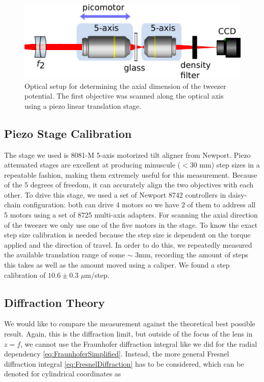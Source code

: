 \begin{figure}
    \centering
    \includegraphics[width=0.6\linewidth]{figures/ZScanSetup.pdf}
    \caption{Optical setup for determining the axial dimension of the tweezer potential. The first objective was scanned along the optical axis using a piezo linear translation stage.}
    \label{fig:ZScanSetup}
\end{figure}


\subsection{Piezo Stage Calibration}

The stage we used is 8081-M 5-axis motorized tilt aligner from Newport. 
Piezo attenuated stages are excellent at producing minuscule ($<30$ mm) step sizes in a repeatable fashion, making them extremely useful for this measurement.
Because of the 5 degrees of freedom, it can accurately align the two objectives with each other. 
To drive this stage, we used a set of Newport 8742 controllers in daisy-chain configuration: both can drive 4 motors so we have 2 of them to address all 5 motors using a set of 8725 multi-axis adapters.
For scanning the axial direction of the tweezer we only use one of the five motors in the stage. 
To know the exact step size calibration is needed because the step size is dependent on the torque applied and the direction of travel.
In order to do this, we repeatedly measured the available translation range of some $\sim$ 3mm, recording the amount of steps this takes as well as the amount moved using a caliper. 
We found a step calibration of $10.6 \pm 0.3$ $\mu$m/step.

\subsection{Diffraction Theory}

We would like to compare the measurement against the theoretical best possible result.
Again, this is the diffraction limit, but outside of the focus of the lens in $z=f$, we cannot use the Fraunhofer diffraction integral like we did for the radial dependency \cref{eq:FraunhoferSimplified}. 
Instead, the more general Fresnel diffraction integral \cref{eq:FresnelDiffraction} has to be considered, which can be denoted for cylindrical coordinates as \cite{Gu2000}

